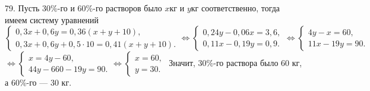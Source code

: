 79. Пусть $30\%$-го и $60\%$-го растворов было $x$кг и $y$кг соответственно, тогда имеем систему уравнений $\begin{cases}
0,3x+0,6y=0,36(x+y+10),\\ 0,3x+0,6y+0,5\cdot10=0,41(x+y+10).\end{cases}\Leftrightarrow\begin{cases}
0,24y-0,06x=3,6,\\ 0,11x-0,19y=0,9.\end{cases}\Leftrightarrow\begin{cases}
4y-x=60,\\ 11x-19y=90.\end{cases}$\\$\Leftrightarrow\begin{cases}
x=4y-60,\\ 44y-660-19y=90.\end{cases}\Leftrightarrow\begin{cases}
x=60,\\ y=30.\end{cases}$ Значит, $30\%$-го раствора было 60 кг, а $60\%$-го --- 30 кг.\\
